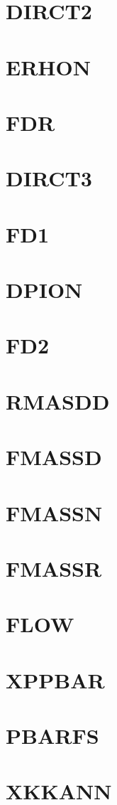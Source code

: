 \documentclass[14pt,UTF8]{ctexbook}
\begin{document}
\section{DIRCT2}
\section{ERHON}
\section{FDR}
\section{DIRCT3}
\section{FD1}
\section{DPION}
\section{FD2}
\section{RMASDD}
\section{FMASSD}
\section{FMASSN}
\section{FMASSR}
\section{FLOW}
\section{XPPBAR}
\section{PBARFS}
\section{XKKANN}
\end{document}
